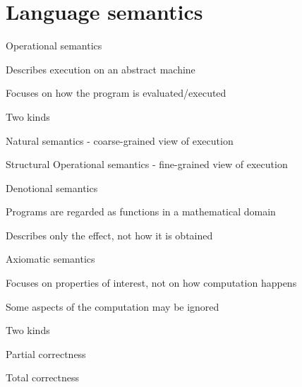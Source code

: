 \section{Language semantics}
\enumstart
	\item Operational semantics
	\enumstart
		\item Describes execution on an abstract machine
		\item Focuses on how the program is evaluated/executed
		\item Two kinds
		\enumstart
			\item Natural semantics - coarse-grained view of execution
			\item Structural Operational semantics - fine-grained view of execution
		\enumend
	\enumend
	\item Denotional semantics
	\enumstart
		\item Programs are regarded as functions in a mathematical domain
		\item Describes only the effect, not how it is obtained
	\enumend
	\item Axiomatic semantics
	\enumstart
		\item Focuses on properties of interest, not on how computation happens
		\item Some aspects of the computation may be ignored
		\item Two kinds
		\enumstart
			\item Partial correctness
			\item Total correctness
		\enumend
	\enumend
\enumend

